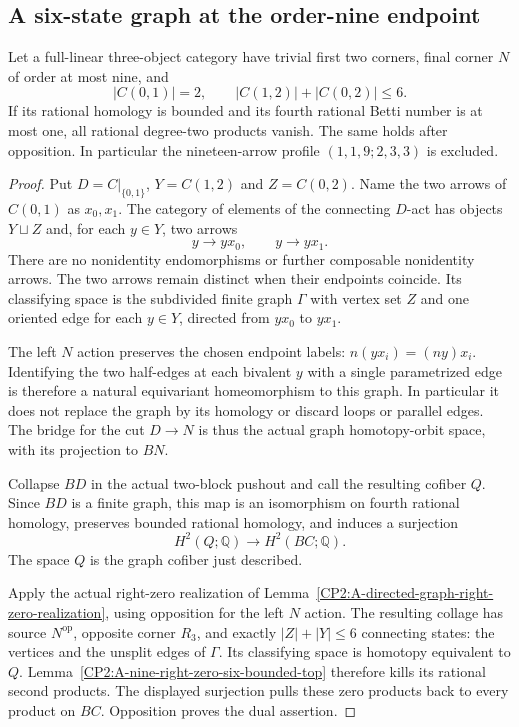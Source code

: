 \subsection{A six-state graph at the order-nine endpoint}

\begin{proposition}
\label{CP2:A-binary-first-six-graph-states-nine}
Let a full-linear three-object category have trivial first two
corners, final corner $N$ of order at most nine, and
\[
 |C(0,1)|=2,\qquad |C(1,2)|+|C(0,2)|\leq6.
\]
If its rational homology is bounded and its fourth rational Betti
number is at most one, all rational degree-two products vanish.
The same holds after opposition.  In particular the nineteen-arrow
profile $(1,1,9;2,3,3)$ is excluded.
\end{proposition}
\begin{proof}
Put $D=C|_{\{0,1\}}$, $Y=C(1,2)$ and $Z=C(0,2)$.
Name the two arrows of $C(0,1)$ as $x_0,x_1$.
The category of elements of the connecting $D$-act has objects
$Y\sqcup Z$ and, for each $y\in Y$, two arrows
\[
                y\longrightarrow yx_0,\qquad
                y\longrightarrow yx_1.
\]
There are no nonidentity endomorphisms or further composable
nonidentity arrows.  The two arrows remain distinct when their
endpoints coincide.  Its classifying space is the subdivided
finite graph $\Gamma$ with vertex set $Z$ and one oriented edge
for each $y\in Y$, directed from $yx_0$ to $yx_1$.

The left $N$ action preserves the chosen endpoint labels:
$n(yx_i)=(ny)x_i$.  Identifying the two half-edges at each
bivalent $y$ with a single parametrized edge is therefore a
natural equivariant homeomorphism to this graph.  In particular
it does not replace the graph by its homology or discard loops
or parallel edges.  The bridge for the cut $D\to N$ is thus
the actual graph homotopy-orbit space, with its projection to
$BN$.

Collapse $BD$ in the actual two-block pushout and call the
resulting cofiber $Q$.  Since $BD$ is a finite graph, this map
is an isomorphism on fourth rational homology, preserves bounded
rational homology, and induces a surjection
\[
                  H^2(Q;\mathbb Q)\longrightarrow H^2(BC;\mathbb Q).
\]
The space $Q$ is the graph cofiber just described.

Apply the actual right-zero realization of
Lemma~\ref{CP2:A-directed-graph-right-zero-realization}, using
opposition for the left $N$ action.  The resulting collage has
source $N^{\mathrm{op}}$, opposite corner $R_3$, and exactly
$|Z|+|Y|\leq6$ connecting states: the vertices and the unsplit
edges of $\Gamma$.  Its classifying space is homotopy equivalent
to $Q$.  Lemma~\ref{CP2:A-nine-right-zero-six-bounded-top}
therefore kills its rational second products.  The displayed
surjection pulls these zero products back to every product on
$BC$.  Opposition proves the dual assertion.
\end{proof}
